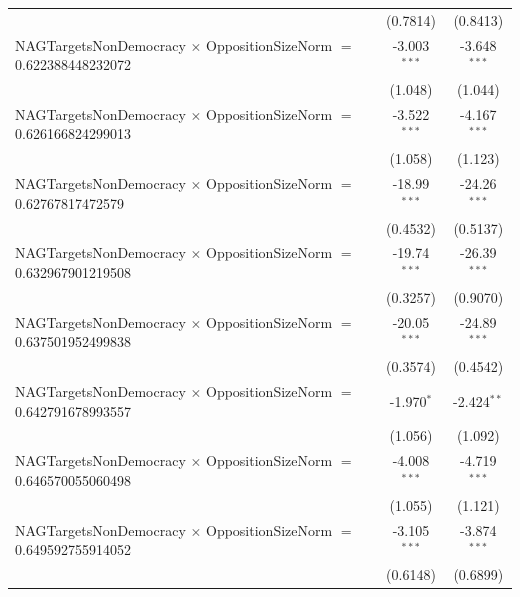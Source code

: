 \begin{tabular}{lcc}
                                                                                & (0.7814)             & (0.8413)\\   
   NAGTargetsNonDemocracy $\times$ OppositionSizeNorm $=$ 0.622388448232072     & -3.003$^{***}$       & -3.648$^{***}$\\   
                                                                                & (1.048)              & (1.044)\\   
   NAGTargetsNonDemocracy $\times$ OppositionSizeNorm $=$ 0.626166824299013     & -3.522$^{***}$       & -4.167$^{***}$\\   
                                                                                & (1.058)              & (1.123)\\   
   NAGTargetsNonDemocracy $\times$ OppositionSizeNorm $=$ 0.62767817472579      & -18.99$^{***}$       & -24.26$^{***}$\\   
                                                                                & (0.4532)             & (0.5137)\\   
   NAGTargetsNonDemocracy $\times$ OppositionSizeNorm $=$ 0.632967901219508     & -19.74$^{***}$       & -26.39$^{***}$\\   
                                                                                & (0.3257)             & (0.9070)\\   
   NAGTargetsNonDemocracy $\times$ OppositionSizeNorm $=$ 0.637501952499838     & -20.05$^{***}$       & -24.89$^{***}$\\   
                                                                                & (0.3574)             & (0.4542)\\   
   NAGTargetsNonDemocracy $\times$ OppositionSizeNorm $=$ 0.642791678993557     & -1.970$^{*}$         & -2.424$^{**}$\\   
                                                                                & (1.056)              & (1.092)\\   
   NAGTargetsNonDemocracy $\times$ OppositionSizeNorm $=$ 0.646570055060498     & -4.008$^{***}$       & -4.719$^{***}$\\   
                                                                                & (1.055)              & (1.121)\\   
   NAGTargetsNonDemocracy $\times$ OppositionSizeNorm $=$ 0.649592755914052     & -3.105$^{***}$       & -3.874$^{***}$\\   
                                                                                & (0.6148)             & (0.6899)\\   

\end{tabular}
